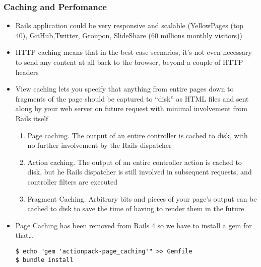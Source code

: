 \documentclass{beamer}
\begin{document}
\begin{frame}
\frametitle{Caching and Perfomance}
\begin{itemize}
\item Rails application could be very responsive and scalable (YellowPages (top 40), GitHub,Twitter, Groupon, SlideShare (60 millions monthly visitors))
\item HTTP caching means that in the best-case scenarios, it's not even necessary to send any content at all back to the browser, beyond a couple of HTTP headers

\item View caching lets you specify that anything from entire pages down to fragments of the page should be captured to ``disk'' as HTML files and sent along by your web server on future request with minimal involvement from Rails itself
\begin{enumerate}
\item Page caching. The output of an entire controller is cached to disk, with no further involvement by the Rails dispatcher
\item Action caching. The output of an entire controller action is cached to disk, but he Rails dispatcher is still involved in subsequent requests, and controller filters are executed
\item Fragment Caching. Arbitrary bits and pieces of your page’s output can be cached to disk
to save the time of having to render them in the future
\end{enumerate}

\item Page Caching has been removed from Rails 4 so we have to install a gem for that\dots
\lstset{language=shell}
\begin{lstlisting}[escapechar=!]
$ echo "gem 'actionpack-page_caching'" >> Gemfile
$ bundle install
\end{lstlisting}
\end{itemize}

\end{frame}
\end{document}
